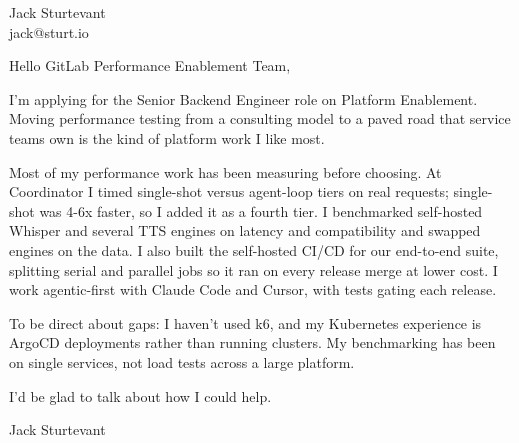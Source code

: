 \documentclass[11pt]{article}
\begin{document}
\raggedright

{\namefont\fontsize{20pt}{24pt}\selectfont Jack Sturtevant}\\[-0.3em]
jack@sturt.io

\vspace{1.2em}

Hello GitLab Performance Enablement Team,

I'm applying for the Senior Backend Engineer role on Platform Enablement. Moving performance testing from a consulting model to a paved road that service teams own is the kind of platform work I like most.

Most of my performance work has been measuring before choosing. At Coordinator I timed single-shot versus agent-loop tiers on real requests; single-shot was 4-6x faster, so I added it as a fourth tier. I benchmarked self-hosted Whisper and several TTS engines on latency and compatibility and swapped engines on the data. I also built the self-hosted CI/CD for our end-to-end suite, splitting serial and parallel jobs so it ran on every release merge at lower cost. I work agentic-first with Claude Code and Cursor, with tests gating each release.

To be direct about gaps: I haven't used k6, and my Kubernetes experience is ArgoCD deployments rather than running clusters. My benchmarking has been on single services, not load tests across a large platform.

I'd be glad to talk about how I could help.

\vspace{0.6em}
Jack Sturtevant
\end{document}
